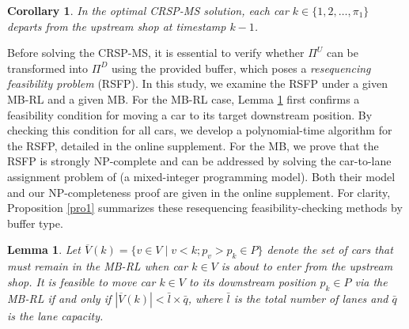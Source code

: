 \documentclass[12pt]{article}
\newtheorem{lemma}[theorem]{Lemma}
\newtheorem{corollary}[theorem]{Corollary}
\begin{document}
\begin{corollary}\label{coro1}
    In the optimal CRSP-MS solution, each car $k\in \{1,2,\dots,\pi_1\}$ departs from the upstream shop at timestamp $k-1$.%
\end{corollary}

Before solving the CRSP-MS, it is essential to verify whether $\Pi^{U}$ can be transformed into $\Pi^{D}$ using the provided buffer, which poses a \textit{resequencing feasibility problem} (RSFP). In this study, we examine the RSFP under a given MB-RL and a given MB. For the MB-RL case, Lemma \ref{lema1} first confirms a feasibility condition for moving a car to its target downstream position. By checking this condition for all cars, we develop a polynomial-time algorithm for the RSFP, detailed in the online supplement. For the MB, we prove that the RSFP is %
strongly NP-complete and can be addressed by solving the car-to-lane assignment problem of \citet{guo2025logic} (a mixed-integer programming model). Both their model and our NP-completeness %
proof are given in the online supplement. For clarity, Proposition \ref{pro1} summarizes these resequencing feasibility-checking methods by buffer type.





\begin{lemma}\label{lema1}
    Let $\overline{V}(k)=\{v\in V \mid v<k;p_v>p_k\in P\}$ denote the set of cars that must remain in the MB-RL when car $k\in V$ is about to enter from the upstream shop. It is feasible to move car $k\in V$ to its downstream position $p_k\in P$ via the MB-RL if and only if $|\overline{V}(k)|<\bar{l}\times \bar{q}$, where $\bar{l}$ is the total number of lanes and $\bar{q}$ is the lane capacity.
\end{lemma}
\end{document}
